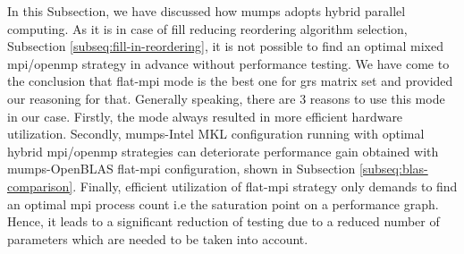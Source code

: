 In this Subsection, we have discussed how \acrshort{mumps} adopts hybrid parallel computing. As it is in case of fill reducing reordering algorithm selection, Subsection \ref{subseq:fill-in-reordering}, it is not possible to find an optimal mixed \acrshort{mpi}/\acrshort{openmp} strategy in advance without performance testing. We have come to the conclusion that flat-\acrshort{mpi} mode is the best one for \acrshort{grs} matrix set and provided our reasoning for that. Generally speaking, there are 3 reasons to use this mode in our case. Firstly, the mode always resulted in more efficient hardware utilization. Secondly,  \acrshort{mumps}-Intel MKL configuration running with optimal hybrid \acrshort{mpi}/\acrshort{openmp} strategies can deteriorate performance gain obtained with \acrshort{mumps}-OpenBLAS flat-\acrshort{mpi} configuration, shown in Subsection \ref{subseq:blas-comparison}. Finally, efficient utilization of flat-\acrshort{mpi} strategy only demands to find an optimal \acrshort{mpi} process count i.e the saturation point on a performance graph. Hence, it leads to a significant reduction of testing due to a reduced number of parameters which are needed to be taken into account.\\
